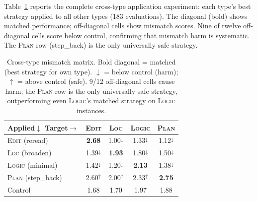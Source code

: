 \documentclass[11pt]{article}
\begin{document}
Table~\ref{tab:cross-type} reports the complete cross-type application experiment: each type's best strategy applied to all other types (183 evaluations).
The diagonal (bold) shows matched performance; off-diagonal cells show mismatch scores.
Nine of twelve off-diagonal cells score below control, confirming that mismatch harm is systematic.
The \textsc{Plan} row (step\_back) is the only universally safe strategy.

\begin{table}[t]
\centering
\small
\begin{tabular}{@{}lcccc@{}}
\toprule
\textbf{Applied$\downarrow$ Target$\rightarrow$} & \textbf{\textsc{Edit}} & \textbf{\textsc{Loc}} & \textbf{\textsc{Logic}} & \textbf{\textsc{Plan}} \\
\midrule
\textsc{Edit} (reread) & \textbf{2.68} & 1.00$^{\downarrow}$ & 1.33$^{\downarrow}$ & 1.12$^{\downarrow}$ \\
\textsc{Loc} (broaden) & 1.39$^{\downarrow}$ & \textbf{1.93} & 1.80$^{\downarrow}$ & 1.50$^{\downarrow}$ \\
\textsc{Logic} (minimal) & 1.42$^{\downarrow}$ & 1.20$^{\downarrow}$ & \textbf{2.13} & 1.38$^{\downarrow}$ \\
\textsc{Plan} (step\_back) & 2.60$^{\uparrow}$ & 2.00$^{\uparrow}$ & 2.33$^{\uparrow}$ & \textbf{2.75} \\
\midrule
Control & 1.68 & 1.70 & 1.97 & 1.88 \\
\bottomrule
\end{tabular}
\caption{Cross-type mismatch matrix. Bold diagonal = matched (best strategy for own type). $\downarrow$ = below control (harm); $\uparrow$ = above control (safe). 9/12 off-diagonal cells cause harm; the \textsc{Plan} row is the only universally safe strategy, outperforming even \textsc{Logic}'s matched strategy on \textsc{Logic} instances.}
\label{tab:cross-type}
\end{table}
\end{document}
